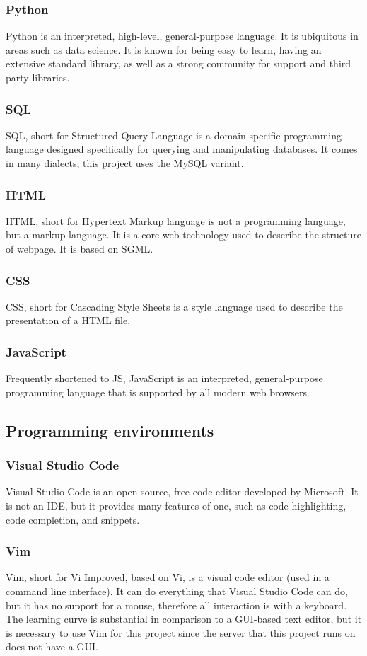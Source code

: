        \subsubsection{Python}
        Python is an interpreted, high-level, general-purpose language. It is ubiquitous in areas such as data science. It is known for being easy to learn, having an extensive standard library, as well as a strong community for support and third party libraries.
        \subsubsection{SQL}
        SQL, short for Structured Query Language is a domain-specific programming language designed specifically for querying and manipulating databases. It comes in many dialects, this project uses the MySQL variant.
        \subsubsection{HTML} 
        HTML, short for Hypertext Markup language is not a programming language, but a markup language. It is a core web technology used to describe the structure of webpage. It is based on SGML.
        \subsubsection{CSS}
        CSS, short for Cascading Style Sheets is a style language used to describe the presentation of a HTML file.
        \subsubsection{JavaScript}
        Frequently shortened to JS, JavaScript is an interpreted, general-purpose programming language that is supported by all modern web browsers.
    \subsection{Programming environments}
        \subsubsection{Visual Studio Code}
        Visual Studio Code is an open source, free code editor developed by Microsoft. It is not an IDE, but it provides many features of one, such as code highlighting, code completion, and snippets.
        \subsubsection{Vim}
        Vim, short for Vi Improved, based on Vi, is a visual code editor (used in a command line interface). It can do everything that Visual Studio Code can do, but it has no support for a mouse, therefore all interaction is with a keyboard. The learning curve is substantial in comparison to a GUI-based text editor, but it is necessary to use Vim for this project since the server that this project runs on does not have a GUI.
